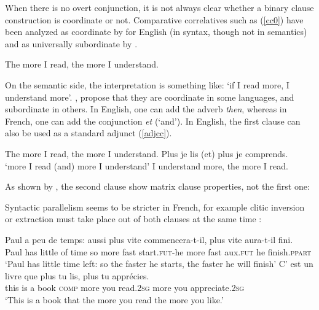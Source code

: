 \documentclass[output=paper
                ,modfonts
                ,nonflat
	        ,collection
	        ,collectionchapter
	        ,collectiontoclongg
 	        ,biblatex
                ,babelshorthands
                ,newtxmath
                ,draftmode
                ,colorlinks, citecolor=brown
]{./langsci/langscibook}
\begin{document}
When there is no overt conjunction, it is not always clear whether a binary clause construction is coordinate or not. Comparative correlatives such as (\ref{cc0}) have been analyzed as coordinate by \citet{culijack} for English (in syntax, though not in semantics) and as universally subordinate  by \citet{dikken}. 

\begin{exe}
\ex The more I read, the more I understand. \label{cc0}
\end{exe}

On the semantic side, the interpretation is something like: `if I read more, I understand more'. \citet{Abeille:06}, \citet{Abeille:Borsley:08} propose that they are  coordinate in some languages, 
 and subordinate in others. In English, one can add the adverb \emph{then}, whereas in French, one can add the conjunction \emph{et} (`and'). In English, the first clause can also be used as a standard adjunct (\ref{adjcc}).
 
 
 
 \begin{exe}
 \ex
\begin{xlista}
\ex The more I read,  the more I understand.
\ex Plus je lis (et) plus je comprends.\\
`more I read (and) more I understand'
\ex I understand more, the more I read.
\end{xlista}\label{adjcc}
\end{exe}

As shown by \citet[549-550]{culijack}, the second clause show matrix clause properties, not the first one:

\begin{exe}
 \ex
\begin{xlista}
\end{xlista}
\end{exe}

Syntactic parallelism seems to be stricter in French, for example clitic inversion or extraction must take place out of both clauses at the same time \citep{Abeille:Borsley:08}:

\begin{exe}
 \ex
\begin{xlista}
\ex \gll Paul a     peu  de temps: aussi plus  vite commencera-t-il,  plus   vite  aura-t-il  fini.\\
Paul has little of time so more fast start.\textsc{fut}-he more fast  aux.\textsc{fut} he finish.\textsc{ppart} \\
\glt `Paul has little time left: so the faster he starts, the faster he will finish'
\ex \gll C'   est un livre  que      plus   tu    lis, plus  tu    appr\'{e}cies. \\
this is    a  book \textsc{comp} more you read.2\textsc{sg}  more you appreciate.2\textsc{sg} \\
\glt `This is a book that the more you read the more you like.'
\end{xlista}
\end{exe}
\end{document}

